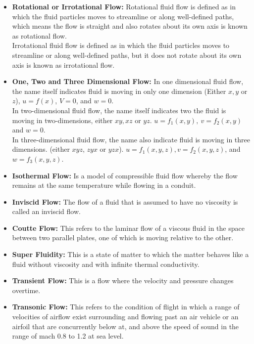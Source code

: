 \documentclass[11pt]{report}
\newcommand{\sps}{\\[0.2cm]}
\newcommand{\bt}[1]{\textbf{#1}}
\begin{document}
\begin{itemize}[label=--]
		\item\bt{Rotational or Irrotational Flow:} Rotational fluid flow is defined as in which the fluid particles moves to streamline or along well-defined paths, which means the flow is straight and also rotates about its own axis is known as rotational flow.\sps
		Irrotational fluid flow is defined as in which the fluid particles moves to streamline or along well-defined paths, but it does not rotate about its own axis is known as irrotational flow.
		
		\item\bt{One, Two and Three Dimensional Flow:} In one dimensional fluid flow, the name itself indicates fluid is moving in only one dimension (Either $x,y$ or $z$), $u=f(x)$, $V=0$, and $w=0$.\sps
		In two-dimensional fluid flow, the name itself indicates two the fluid is moving in two-dimensions, either $xy, xz$ or $yz$. $u=f_1(x,y),~ v=f_2(x,y)$ and $w=0$.\sps
		In three-dimensional fluid flow, the name also indicate fluid is moving in three dimensions. (either $xyz$, $zyx$ or $yzx$). $u=f_1(x,y,z), v=f_2(x,y,z)$, and $w=f_3(x,y,z)$.
		
		\item \bt{Isothermal Flow:} Is a model of compressible fluid flow whereby the flow remains at the same temperature while flowing in a conduit.
		
		\item\bt{Inviscid Flow:} The flow of a fluid that is assumed to have no viscosity is called an inviscid flow.
		
		\item\bt{Coutte Flow:} This refers to the laminar flow of a viscous fluid in the space between two parallel plates, one of which is moving relative to the other.
		
		\item\bt{Super Fluidity:} This is a state of matter to which the matter behaves like a fluid without viscosity and with infinite thermal conductivity.
		
		\item\bt{Transient Flow:} This is a flow where the velocity and pressure changes overtime.
		
		\item\bt{Transonic Flow:} This refers to the condition of flight in which a range of velocities of airflow exist surrounding and flowing past an air vehicle or an airfoil  that are concurrently below at, and above the speed of sound in the range of mach 0.8 to 1.2 at sea level.
	\end{itemize}
	
\end{document}
